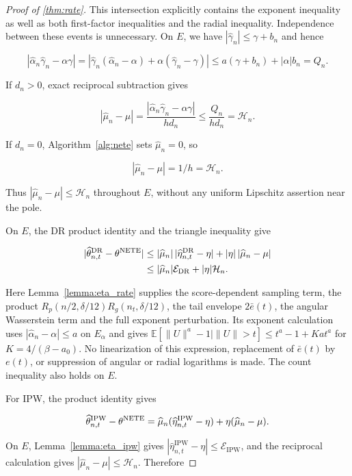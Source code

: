 \documentclass[12pt]{article}
\theoremstyle{plain}
\theoremstyle{definition}
\begin{document}
\begin{proof}[Proof of \cref{thm:rate}]
This intersection explicitly contains the exponent inequality as well as both first-factor inequalities and the radial inequality. Independence between these events is unnecessary. On $E$, we have $|\hat\gamma_n|\leq\gamma+b_n$ and hence

\[
|\hat\alpha_n\hat\gamma_n-\alpha\gamma|
=|\hat\gamma_n(\hat\alpha_n-\alpha)+\alpha(\hat\gamma_n-\gamma)|
\leq a(\gamma+b_n)+|\alpha|b_n=Q_n.
\]

If $d_n>0$, exact reciprocal subtraction gives

\[
|\hat\mu_n-\mu|
=\frac{|\hat\alpha_n\hat\gamma_n-\alpha\gamma|}{h d_n}
\leq\frac{Q_n}{h d_n}=\mathcal H_n.
\]

If $d_n=0$, Algorithm~\ref{alg:nete} sets $\hat\mu_n=0$, so

\[
|\hat\mu_n-\mu|=1/h=\mathcal H_n.
\]

Thus $|\hat\mu_n-\mu|\leq\mathcal H_n$ throughout $E$, without any uniform Lipschitz assertion near the pole. 

On $E$, the DR product identity and the triangle inequality give

\[
\begin{aligned}
|\widehat\theta_{n,t}^{\mathrm{DR}}-\theta^{\operatorname{NETE}}|
&\leq|\widehat\mu_n|\,|\widehat\eta_{n,t}^{\mathrm{DR}}-\eta|+|\eta|\,|\widehat\mu_n-\mu|\\
&\leq|\widehat\mu_n|\mathcal E_{\mathrm{DR}}+|\eta|\mathcal H_n.
\end{aligned}
\]

Here Lemma~\ref{lemma:eta_rate} supplies the score-dependent sampling term, the product $R_p(n/2,\delta/12)R_g(n_t,\delta/12)$, the tail envelope $2\bar e(t)$, the angular Wasserstein term and the full exponent perturbation. Its exponent calculation uses $|\hat\alpha_n-\alpha|\leq a$ on $E_\alpha$ and gives $\mathbb E[\|U\|^a-1\mid\|U\|>t]\leq t^a-1+Kat^a$ for $K=4/(\beta-a_0)$. No linearization of this expression, replacement of $\bar e(t)$ by $e(t)$, or suppression of angular or radial logarithms is made. The count inequality also holds on $E$. 

For IPW, the product identity gives

\[
\widehat\theta_{n,t}^{\mathrm{IPW}}-\theta^{\operatorname{NETE}}
=\widehat\mu_n(\widehat\eta_{n,t}^{\mathrm{IPW}}-\eta)+\eta(\widehat\mu_n-\mu).
\]

On $E$, Lemma~\ref{lemma:eta_ipw} gives $|\hat\eta_{n,t}^{\mathrm{IPW}}-\eta|\leq\mathcal E_{\mathrm{IPW}}$, and the reciprocal calculation gives $|\hat\mu_n-\mu|\leq\mathcal H_n$. Therefore


\end{proof}
\end{document}
